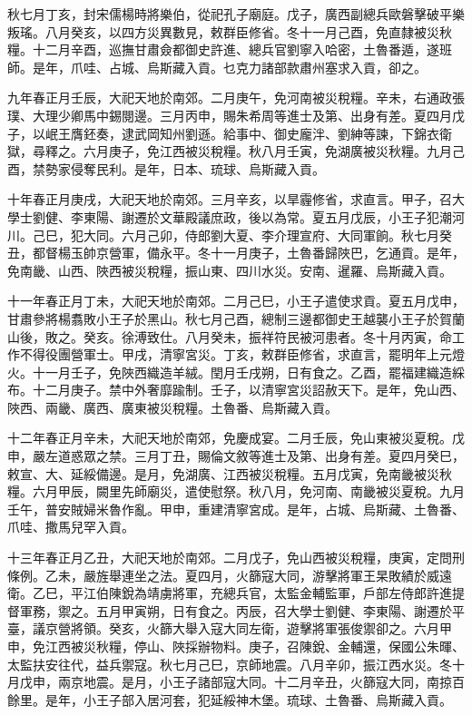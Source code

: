 \begin{pinyinscope}
秋七月丁亥，封宋儒楊時將樂伯，從祀孔子廟庭。戊子，廣西副總兵歐磐擊破平樂叛瑤。八月癸亥，以四方災異數見，敕群臣修省。冬十一月己酉，免直隸被災秋糧。十二月辛酉，巡撫甘肅僉都御史許進、總兵官劉寧入哈密，土魯番遁，遂班師。是年，爪哇、占城、烏斯藏入貢。乜克力諸部款肅州塞求入貢，卻之。

九年春正月壬辰，大祀天地於南郊。二月庚午，免河南被災稅糧。辛未，右通政張璞、大理少卿馬中錫閱邊。三月丙申，賜朱希周等進士及第、出身有差。夏四月戊子，以岷王膺鉟奏，逮武岡知州劉遜。給事中、御史龐泮、劉紳等諫，下錦衣衛獄，尋釋之。六月庚子，免江西被災稅糧。秋八月壬寅，免湖廣被災秋糧。九月己酉，禁勢家侵奪民利。是年，日本、琉球、烏斯藏入貢。

十年春正月庚戌，大祀天地於南郊。三月辛亥，以旱霾修省，求直言。甲子，召大學士劉健、李東陽、謝遷於文華殿議庶政，後以為常。夏五月戊辰，小王子犯潮河川。己巳，犯大同。六月己卯，侍郎劉大夏、李介理宣府、大同軍餉。秋七月癸丑，都督楊玉帥京營軍，備永平。冬十一月庚子，土魯番歸陜巴，乞通貢。是年，免南畿、山西、陜西被災稅糧，振山東、四川水災。安南、暹羅、烏斯藏入貢。

十一年春正月丁未，大祀天地於南郊。二月己巳，小王子遣使求貢。夏五月戊申，甘肅參將楊翥敗小王子於黑山。秋七月己酉，總制三邊都御史王越襲小王子於賀蘭山後，敗之。癸亥。徐溥致仕。八月癸未，振祥符民被河患者。冬十月丙寅，命工作不得役團營軍士。甲戌，清寧宮災。丁亥，敕群臣修省，求直言，罷明年上元燈火。十一月壬子，免陜西織造羊絨。閏月壬戌朔，日有食之。乙酉，罷福建織造綵布。十二月庚子。禁中外奢靡踰制。壬子，以清寧宮災詔赦天下。是年，免山西、陜西、兩畿、廣西、廣東被災稅糧。土魯番、烏斯藏入貢。

十二年春正月辛未，大祀天地於南郊，免慶成宴。二月壬辰，免山東被災夏稅。戊申，嚴左道惑眾之禁。三月丁丑，賜倫文敘等進士及第、出身有差。夏四月癸巳，敕宣、大、延綏備邊。是月，免湖廣、江西被災稅糧。五月戊寅，免南畿被災秋糧。六月甲辰，闕里先師廟災，遣使慰祭。秋八月，免河南、南畿被災夏稅。九月壬午，普安賊婦米魯作亂。甲申，重建清寧宮成。是年，占城、烏斯藏、土魯番、爪哇、撒馬兒罕入貢。

十三年春正月乙丑，大祀天地於南郊。二月戊子，免山西被災稅糧，庚寅，定問刑條例。乙未，嚴旌舉連坐之法。夏四月，火篩寇大同，游擊將軍王杲敗績於威遠衛。乙巳，平江伯陳銳為靖虜將軍，充總兵官，太監金輔監軍，戶部左侍郎許進提督軍務，禦之。五月甲寅朔，日有食之。丙辰，召大學士劉健、李東陽、謝遷於平臺，議京營將領。癸亥，火篩大舉入寇大同左衛，遊擊將軍張俊禦卻之。六月甲申，免江西被災秋糧，停山、陜採辦物料。庚子，召陳銳、金輔還，保國公朱暉、太監扶安往代，益兵禦寇。秋七月己巳，京師地震。八月辛卯，振江西水災。冬十月戊申，兩京地震。是月，小王子諸部寇大同。十二月辛丑，火篩寇大同，南掠百餘里。是年，小王子部入居河套，犯延綏神木堡。琉球、土魯番、烏斯藏入貢。


\end{pinyinscope}
